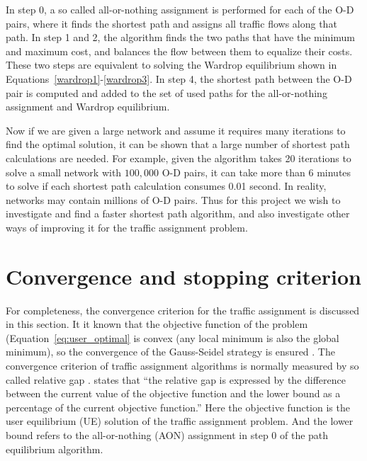 In step 0, a so called all-or-nothing assignment is performed for each of the O-D pairs,
where it finds the shortest path and assigns all traffic flows along that path.
In step 1 and 2, the algorithm finds the two paths that have the minimum and maximum cost,
and balances the flow between them to equalize their costs.
These two steps are equivalent to solving the Wardrop equilibrium shown in Equations~\eqref{wardrop1}-\eqref{wardrop3}.
In step 4, the shortest path between the O-D pair is computed and added to the set of used paths for the all-or-nothing assignment and Wardrop equilibrium.

Now if we are given a large network and assume it requires many iterations to find the optimal solution,
it can be shown that a large number of shortest path calculations are needed.
For example, 
given the algorithm takes 20 iterations to solve a small network with $100,000$ O-D pairs,
it can take more than 6 minutes to solve if
each shortest path calculation consumes 0.01 second.
In reality,
networks may contain millions of O-D pairs.
Thus for this project we wish to
investigate and find a faster shortest path algorithm,
and also investigate other ways of improving it for the traffic assignment problem.

\section{Convergence and stopping criterion} \label{sec:convergence}
For completeness, the convergence criterion for the traffic assignment is discussed in this section.
It it known that the objective function of the problem (Equation~\ref{eq:user_optimal} is convex (any local minimum is also the global minimum),
so the convergence of the Gauss-Seidel strategy is ensured \citep{Florian2008}.
The convergence criterion of traffic assignment algorithms is normally measured by so called relative gap \citep{Rose}.
\cite{Rose} states that ``the relative gap is expressed by the difference between the current value of 
the objective function and the lower bound as a percentage of the current objective function.''
Here the objective function is the user equilibrium (UE) solution of the traffic assignment problem.
And the lower bound refers to the all-or-nothing (AON) assignment in step 0 of the path equilibrium algorithm.

